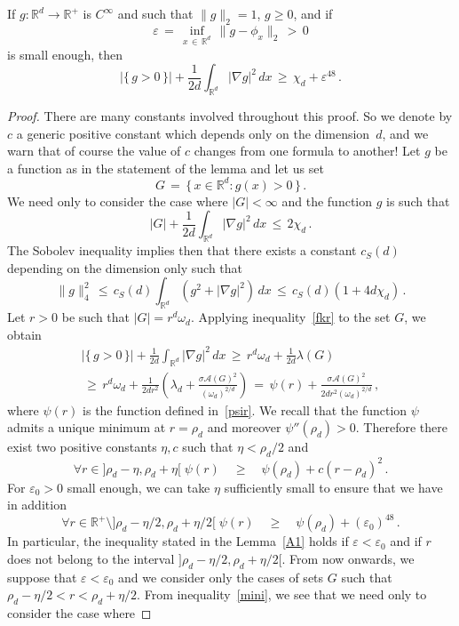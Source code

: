 \documentclass[AHL, Unicode, longabstracts, published]{cedram}
\newcommand*\Rd {{\mathbb R^d}}
\newcommand*\R{\mathbb{R}}
\newcommand{\cA}{\mathcal{A}}
\let\oldforall\forall
\renewcommand*{\forall}{\mathrel{\oldforall}}
\begin{document}
\begin{lemm}\label{A1}
If $g:\Rd\to\R^+$ is $C^\infty$ and such that $\|g\|_2=1$, $g\geq 0$, and if
\[
\varepsilon\,=\,\inf_{x\,\in\,\Rd}\,\|g-\phi_x\|_2\,>\,0
\]
is small enough, then
\[
\big|\{\,g>0\,\}\big|+\frac{1}{2d}
\int_{\Rd}\big|\nabla g\big|^2\,dx\,\geq\,\chi_d+\varepsilon^{48}\,.
\]
\end{lemm}
\begin{proof}
There are many constants involved throughout this proof. So we denote by $c$ a generic positive constant which depends only on the dimension~$d$, and we warn that of course the value of $c$ changes from one formula to another! Let $g$ be a function as in the statement of the lemma and let us set
\[
G\,=\,\big\{\,x\in \Rd:g(x)>0\,\big\}\,.
\]
We need only to consider the case where $|G|<\infty$ and the function $g$ is such that
\[
\big|G\big|+\frac{1}{2d}
\int_{\Rd}\big|\nabla g\big|^2\,dx\,\leq\,2\chi_d\,.
\]
The Sobolev inequality implies then that there exists a constant $c_S(d)$ depending on the dimension only such that
\begin{equation}\label{aob}
\|g\|_4^2\,\leq\,c_S(d)
\int_{\Rd}\left(g^2+\big|\nabla g\big|^2\right)\,dx\,\leq\,c_S(d)(1+4d\chi_d)\,.
\end{equation}
Let $r>0$ be such that $|G|=r^d\omega_d$. Applying inequality~\eqref{fkr} to the set $G$, we obtain
\begin{multline}\label{sati}
\big|\{\,g>0\,\}\big|+\frac{1}{2d}
\int_{\Rd}\big|\nabla g\big|^2\,dx\,\geq\, r^d\omega_d+
\frac{1}{2d}\lambda(G)\\
\,\geq\, r^d\omega_d+
\frac{1}{2dr^{2}}\left(\lambda_d+
\frac{ \sigma\cA(G)^2 }{(\omega_d)^{2/d}}
\right)
\,=\,
\psi(r)+
\frac{ \sigma\cA(G)^2 }{ {2dr^{2} (\omega_d)^{2/d}} }\,,
\end{multline}
where $\psi(r)$ is the function defined in~\eqref{psir}. We recall that the function $\psi$ admits a unique minimum at $r=\rho_d$ and moreover $\psi''(\rho_d)>0$. Therefore there exist two positive constants $\eta,c$ such that $\eta<\rho_d/2$ and
\begin{equation}\label{mini}
\forall r\in]\rho_d-\eta,\rho_d+\eta[\;
\psi(r)\quad\geq \quad\psi(\rho_d)+c(r-\rho_d)^2\,.
\end{equation}
For $\varepsilon_0>0$ small enough, we can take $\eta$ sufficiently small to ensure that we have in addition
\[
\forall r\in \R^+\setminus]\rho_d-\eta/2,\rho_d+\eta/2[\;
\psi(r)\quad\geq\quad
\psi(\rho_d)+
(\varepsilon_0)^{48}\,.
\]
In particular, the inequality stated in the Lemma~\ref{A1} holds if $\varepsilon<\varepsilon_0$ and if $r$ does not belong to the interval $]\rho_d-\eta/2,\rho_d+\eta/2[$. From now onwards, we suppose that $\varepsilon<\varepsilon_0$ and we consider only the cases of sets $G$ such that $\rho_d-\eta/2< r<\rho_d+\eta/2$. From inequality~\eqref{mini}, we see that we need only to consider the case where

\end{proof}
\end{document}
